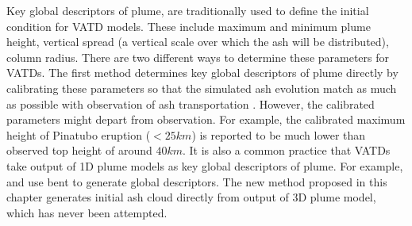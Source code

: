 Key global descriptors of plume, are traditionally used to define the initial condition for VATD models. These include maximum and minimum plume height, vertical spread (a vertical scale over which the ash will be distributed), column radius. There are two different ways to determine these parameters for VATDs. The first method determines key global descriptors of plume directly by calibrating these parameters so that the simulated ash evolution match as much as possible with observation of ash transportation \citep[e.g.][]{fero2008simulation,fero2009simulating}. However, the calibrated parameters might depart from observation. For example, the calibrated maximum height of Pinatubo eruption ($<25 km$) is reported to be much lower \citep{fero2009simulating} than observed top height of around $40 km$. It is also a common practice that VATDs take output of 1D plume models as key global descriptors of plume. For example, \citet{bursik2012estimation} and \citet{ stefanescu2014temporal} use bent \citep{bursik2001effect} to generate global descriptors. The new method proposed in this chapter generates initial ash cloud directly from output of 3D plume model, which has never been attempted.
%
